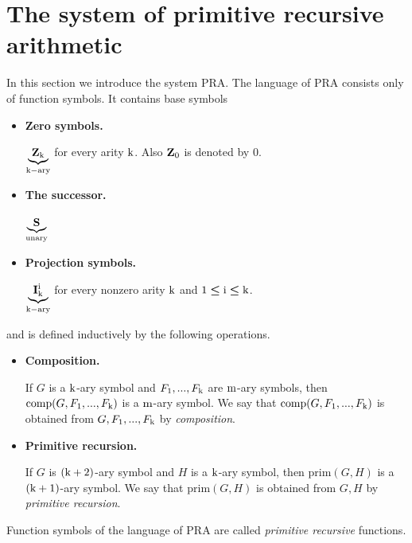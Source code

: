 \documentclass[10pt]{amsart}
\newcommand{\mleq}{\boldsymbol{\leq}}
\begin{document}
\section{The system of primitive recursive arithmetic}\label{section:system_of_primitive_recursive_arithmetic}
\noindent
In this section we introduce the system $\mathrm{PRA}$. The language of $\mathrm{PRA}$ consists only of function symbols. It contains base symbols
\begin{itemize}
	\item[] \textbf{Zero symbols.}

	      $\underbrace{\mathbf{Z}_{\rm{k}}}_{\rm{k-ary}}$ for every arity $\rm{k}$. Also $\mathbf{Z}_{\rm{0}}$ is denoted by $0$.
	\item[] \textbf{The successor.}

	      $\underbrace{\mathbf{S}}_{\mathrm{unary}}$
	\item[] \textbf{Projection symbols.}

	      $\underbrace{\mathbf{I}^{\rm{i}}_{\rm{k}}}_{\rm{k-ary}}$ for every nonzero arity $\rm{k}$ and $\rm{1} \mleq \rm{i} \mleq k$.
\end{itemize}
and is defined inductively by the following operations.
\begin{itemize}
	\item[] \textbf{Composition.}

	      If $G$ is a $\rm{k}$-ary symbol and $F_{\rm{1}},...,F_{\rm{k}}$ are $\rm{m}$-ary symbols, then $\mathrm{comp}(G,F_{\rm{1}},...,F_{\rm{k}})$ is a $\rm{m}$-ary symbol. We say that $\mathrm{comp}(G,F_{\rm{1}},...,F_{\rm{k}})$ is obtained from $G,F_{\rm{1}},...,F_{\rm{k}}$ by \textit{composition}.
	\item[] \textbf{Primitive recursion.}

	      If $G$ is $\rm{(k+2)}$-ary symbol and $H$ is a $\rm{k}$-ary symbol, then $\mathrm{prim}(G,H)$ is a $\rm{(k+1)}$-ary symbol. We say that $\mathrm{prim}(G,H)$ is obtained from $G,H$ by \textit{primitive recursion}.
\end{itemize}

\begin{definition}
	Function symbols of the language of $\mathrm{PRA}$ are called \textit{primitive recursive} functions.
\end{definition}
\end{document}
